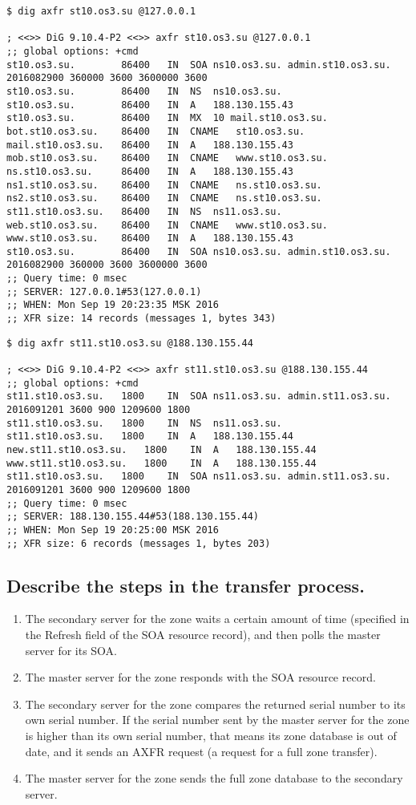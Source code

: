 \documentclass[a4paper,11pt]{article}
\begin{document}
\begin{lstlisting}
$ dig axfr st10.os3.su @127.0.0.1

; <<>> DiG 9.10.4-P2 <<>> axfr st10.os3.su @127.0.0.1
;; global options: +cmd
st10.os3.su.        86400   IN  SOA ns10.os3.su. admin.st10.os3.su. 2016082900 360000 3600 3600000 3600
st10.os3.su.        86400   IN  NS  ns10.os3.su.
st10.os3.su.        86400   IN  A   188.130.155.43
st10.os3.su.        86400   IN  MX  10 mail.st10.os3.su.
bot.st10.os3.su.    86400   IN  CNAME   st10.os3.su.
mail.st10.os3.su.   86400   IN  A   188.130.155.43
mob.st10.os3.su.    86400   IN  CNAME   www.st10.os3.su.
ns.st10.os3.su.     86400   IN  A   188.130.155.43
ns1.st10.os3.su.    86400   IN  CNAME   ns.st10.os3.su.
ns2.st10.os3.su.    86400   IN  CNAME   ns.st10.os3.su.
st11.st10.os3.su.   86400   IN  NS  ns11.os3.su.
web.st10.os3.su.    86400   IN  CNAME   www.st10.os3.su.
www.st10.os3.su.    86400   IN  A   188.130.155.43
st10.os3.su.        86400   IN  SOA ns10.os3.su. admin.st10.os3.su. 2016082900 360000 3600 3600000 3600
;; Query time: 0 msec
;; SERVER: 127.0.0.1#53(127.0.0.1)
;; WHEN: Mon Sep 19 20:23:35 MSK 2016
;; XFR size: 14 records (messages 1, bytes 343)
\end{lstlisting}

\begin{lstlisting}
$ dig axfr st11.st10.os3.su @188.130.155.44

; <<>> DiG 9.10.4-P2 <<>> axfr st11.st10.os3.su @188.130.155.44
;; global options: +cmd
st11.st10.os3.su.   1800    IN  SOA ns11.os3.su. admin.st11.os3.su. 2016091201 3600 900 1209600 1800
st11.st10.os3.su.   1800    IN  NS  ns11.os3.su.
st11.st10.os3.su.   1800    IN  A   188.130.155.44
new.st11.st10.os3.su.   1800    IN  A   188.130.155.44
www.st11.st10.os3.su.   1800    IN  A   188.130.155.44
st11.st10.os3.su.   1800    IN  SOA ns11.os3.su. admin.st11.os3.su. 2016091201 3600 900 1209600 1800
;; Query time: 0 msec
;; SERVER: 188.130.155.44#53(188.130.155.44)
;; WHEN: Mon Sep 19 20:25:00 MSK 2016
;; XFR size: 6 records (messages 1, bytes 203)
\end{lstlisting}  

\subsection{Describe the steps in the transfer process.}
\begin{enumerate}
    \item The secondary server for the zone waits a certain amount of time (specified in the Refresh field of the SOA resource record), and then polls the master server for its SOA.
    \item The master server for the zone responds with the SOA resource record.
    \item The secondary server for the zone compares the returned serial number to its own serial number. If the serial number sent by the master server for the zone is higher than its own serial number, that means its zone database is out of date, and it sends an AXFR request (a request for a full zone transfer).
    \item The master server for the zone sends the full zone database to the secondary server.
\end{enumerate}
\end{document}
